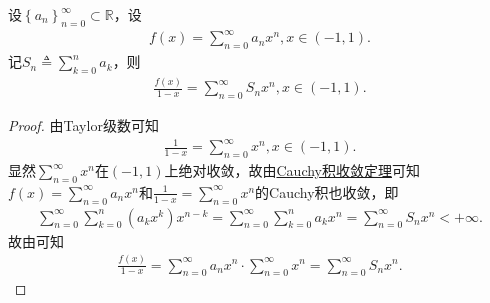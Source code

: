 \documentclass[../../main.tex]{subfiles}%
\begin{document}
\begin{proposition}\label{proposition:幂级数Cauchy积常用技巧}
设$\left\{ a_n \right\} _{n=0}^{\infty}\subset \mathbb{R}$，设
\begin{align*}
f\left( x \right) =\sum_{n=0}^{\infty}{a_nx^n},x\in \left( -1,1 \right) .
\end{align*}
记$S_n\triangleq \sum_{k=0}^n{a_k}$，则
\begin{align*}
\frac{f\left( x \right)}{1-x}=\sum_{n=0}^{\infty}{S_nx^n},x\in \left( -1,1 \right) .
\end{align*}
\end{proposition}
\begin{proof}

由Taylor级数可知
\begin{align*}
\frac{1}{1-x}=\sum_{n=0}^{\infty}{x^n},x\in \left( -1,1 \right) .
\end{align*}
显然$\sum_{n=0}^{\infty}{x^n}$在$\left( -1,1 \right)$上绝对收敛，故由\hyperref[theorem:Cauchy积收敛定理]{Cauchy积收敛定理}可知$f\left( x \right) =\sum_{n=0}^{\infty}{a_nx^n}$和$\frac{1}{1-x}=\sum_{n=0}^{\infty}{x^n}$的Cauchy积也收敛，即
\begin{align*}
\sum_{n=0}^{\infty}{\sum_{k=0}^n{\left( a_kx^k \right) x^{n-k}}}=\sum_{n=0}^{\infty}{\sum_{k=0}^n{a_kx^n}}=\sum_{n=0}^{\infty}{S_nx^n}<+\infty .
\end{align*}
故由可知
\begin{align*}
\frac{f\left( x \right)}{1-x}=\sum_{n=0}^{\infty}{a_nx^n}\cdot \sum_{n=0}^{\infty}{x^n}=\sum_{n=0}^{\infty}{S_nx^n}.
\end{align*}

\end{proof}
\end{document}
